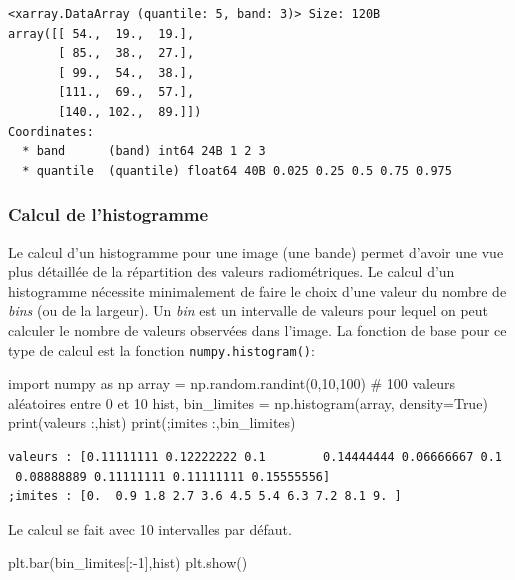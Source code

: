 \documentclass[
  11pt,
  letterpaper,
  open=any,
  twoside=false,
  french]{scrbook}
\newenvironment{Shaded}{\begin{snugshade}}{\end{snugshade}}
\newcommand{\BuiltInTok}[1]{\textcolor[rgb]{0.00,0.23,0.31}{#1}}
\newcommand{\CommentTok}[1]{\textcolor[rgb]{0.37,0.37,0.37}{#1}}
\newcommand{\DecValTok}[1]{\textcolor[rgb]{0.68,0.00,0.00}{#1}}
\newcommand{\ImportTok}[1]{\textcolor[rgb]{0.00,0.46,0.62}{#1}}
\newcommand{\NormalTok}[1]{\textcolor[rgb]{0.00,0.23,0.31}{#1}}
\newcommand{\OperatorTok}[1]{\textcolor[rgb]{0.37,0.37,0.37}{#1}}
\newcommand{\StringTok}[1]{\textcolor[rgb]{0.13,0.47,0.30}{#1}}
\newcommand{\VariableTok}[1]{\textcolor[rgb]{0.07,0.07,0.07}{#1}}
\begin{document}
\begin{verbatim}
<xarray.DataArray (quantile: 5, band: 3)> Size: 120B
array([[ 54.,  19.,  19.],
       [ 85.,  38.,  27.],
       [ 99.,  54.,  38.],
       [111.,  69.,  57.],
       [140., 102.,  89.]])
Coordinates:
  * band      (band) int64 24B 1 2 3
  * quantile  (quantile) float64 40B 0.025 0.25 0.5 0.75 0.975
\end{verbatim}

\subsubsection{Calcul de l'histogramme}\label{calcul-de-lhistogramme}

Le calcul d'un histogramme pour une image (une bande) permet d'avoir une
vue plus détaillée de la répartition des valeurs radiométriques. Le
calcul d'un histogramme nécessite minimalement de faire le choix d'une
valeur du nombre de \emph{bins} (ou de la largeur). Un \emph{bin} est un
intervalle de valeurs pour lequel on peut calculer le nombre de valeurs
observées dans l'image. La fonction de base pour ce type de calcul est
la fonction \texttt{numpy.histogram()}:

\begin{Shaded}
\begin{Highlighting}[]
\ImportTok{import}\NormalTok{ numpy }\ImportTok{as}\NormalTok{ np}
\NormalTok{array }\OperatorTok{=}\NormalTok{ np.random.randint(}\DecValTok{0}\NormalTok{,}\DecValTok{10}\NormalTok{,}\DecValTok{100}\NormalTok{) }\CommentTok{\# 100 valeurs aléatoires entre 0 et 10}
\NormalTok{hist, bin\_limites }\OperatorTok{=}\NormalTok{ np.histogram(array, density}\OperatorTok{=}\VariableTok{True}\NormalTok{)}
\BuiltInTok{print}\NormalTok{(}\StringTok{\textquotesingle{}valeurs :\textquotesingle{}}\NormalTok{,hist)}
\BuiltInTok{print}\NormalTok{(}\StringTok{\textquotesingle{};imites :\textquotesingle{}}\NormalTok{,bin\_limites)}
\end{Highlighting}
\end{Shaded}

\begin{verbatim}
valeurs : [0.11111111 0.12222222 0.1        0.14444444 0.06666667 0.1
 0.08888889 0.11111111 0.11111111 0.15555556]
;imites : [0.  0.9 1.8 2.7 3.6 4.5 5.4 6.3 7.2 8.1 9. ]
\end{verbatim}

Le calcul se fait avec 10 intervalles par défaut.

\begin{Shaded}
\begin{Highlighting}[]
\NormalTok{plt.bar(bin\_limites[:}\OperatorTok{{-}}\DecValTok{1}\NormalTok{],hist)}
\NormalTok{plt.show()}
\end{Highlighting}
\end{Shaded}
\end{document}
